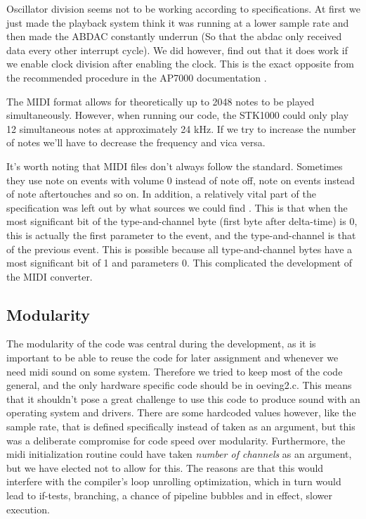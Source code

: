 \documentclass[a4paper,12pt]{article}
\begin{document}
Oscillator division seems not to be working according to specifications. At first we just made the playback system think it was running at a lower sample rate and then made the ABDAC constantly underrun (So that the abdac only received data every other interrupt cycle). We did however, find out that it does work if we enable clock division after enabling the clock. This is the exact opposite from the recommended procedure in the AP7000 documentation \cite{ap7000}.

The MIDI format allows for theoretically up to 2048 notes to be played simultaneously. However, when running our code, the STK1000 could only play 12 simultaneous notes at approximately 24 kHz. If we try to increase the number of notes we’ll have to decrease the frequency and vica versa.

It’s worth noting that MIDI files don’t always follow the standard. Sometimes they use note on events with volume 0 instead of note off, note on events instead of note aftertouches and so on. In addition, a relatively vital part of the specification was left out by what sources we could find \cite{sonicspot} \cite{mididoc}. This is that when the most significant bit of the type-and-channel byte (first byte after delta-time) is 0, this is actually the first parameter to the event, and the type-and-channel is that of the previous event. This is possible because all type-and-channel bytes have a most significant bit of 1 and parameters 0. This complicated the development of the MIDI converter.


\subsection{Modularity}

The modularity of the code was central during the development, as it is important to be able to reuse the code for later assignment and whenever we need midi sound on some system. Therefore we tried to keep most of the code general, and the only hardware specific code should be in oeving2.c. This means that it shouldn’t pose a great challenge to use this code to produce sound with an operating system and drivers. There are some hardcoded values however, like the sample rate, that is defined specifically instead of taken as an argument, but this was a deliberate compromise for code speed over modularity. Furthermore, the midi initialization routine could have taken \emph{number of channels} as an argument, but we have elected not to allow for this. The reasons are that this would interfere with the compiler’s loop unrolling optimization, which in turn would lead to if-tests, branching, a chance of pipeline bubbles and in effect, slower execution.
\end{document}
